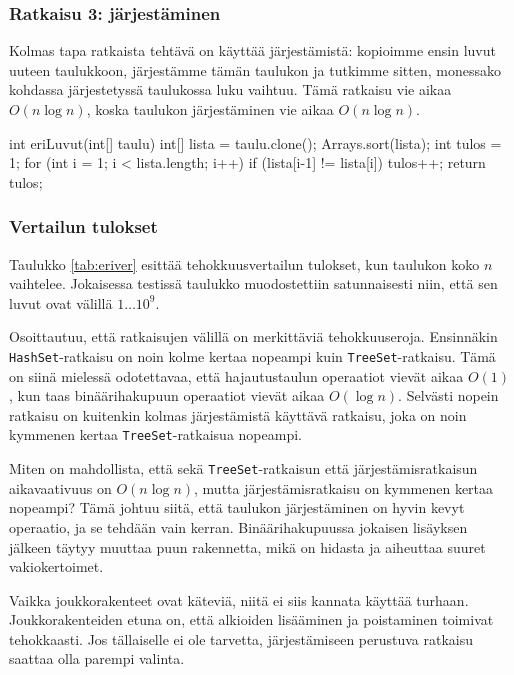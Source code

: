 \subsubsection{Ratkaisu 3: järjestäminen}

Kolmas tapa ratkaista tehtävä on käyttää järjestämistä:
kopioimme ensin luvut uuteen taulukkoon, järjestämme tämän taulukon ja
tutkimme sitten, monessako kohdassa järjestetyssä taulukossa luku vaihtuu.
Tämä ratkaisu vie aikaa $O(n \log n)$, koska taulukon järjestäminen
vie aikaa $O(n \log n)$.

\begin{code}
int eriLuvut(int[] taulu) {
    int[] lista = taulu.clone();
    Arrays.sort(lista);
    int tulos = 1;
    for (int i = 1; i < lista.length; i++) {
        if (lista[i-1] != lista[i]) tulos++;
    }
    return tulos;
}
\end{code}

\subsubsection{Vertailun tulokset}

Taulukko \ref{tab:eriver} esittää tehokkuusvertailun tulokset,
kun taulukon koko $n$ vaihtelee.
Jokaisessa testissä taulukko muodostettiin satunnaisesti niin,
että sen luvut ovat välillä $1 \dots 10^9$.

Osoittautuu, että ratkaisujen välillä on merkittäviä tehokkuuseroja.
Ensinnäkin \texttt{HashSet}-ratkaisu on noin kolme kertaa
nopeampi kuin \texttt{TreeSet}-ratkaisu.
Tämä on siinä mielessä odotettavaa, että hajautustaulun
operaatiot vievät aikaa $O(1)$, kun taas binäärihakupuun
operaatiot vievät aikaa $O(\log n)$.
Selvästi nopein ratkaisu on kuitenkin kolmas järjestämistä
käyttävä ratkaisu, joka on noin kymmenen kertaa
\texttt{TreeSet}-ratkaisua nopeampi.

Miten on mahdollista, että sekä \texttt{TreeSet}-ratkaisun että
järjestämisrat\-kaisun aikavaativuus on $O(n \log n)$, mutta
järjestämisratkaisu on kymmenen kertaa nopeampi?
Tämä johtuu siitä, että taulukon järjestäminen on hyvin kevyt
operaatio, ja se tehdään vain kerran.
Binäärihakupuussa jokaisen lisäyksen jälkeen täytyy muuttaa
puun rakennetta, mikä on hidasta ja aiheuttaa suuret vakiokertoimet.

Vaikka joukkorakenteet ovat käteviä, niitä ei siis kannata
käyttää turhaan.
Joukkorakenteiden etuna on, että alkioiden lisääminen ja poistaminen
toimivat tehokkaasti.
Jos tällaiselle ei ole tarvetta, järjestämiseen perustuva ratkaisu
saattaa olla parempi valinta.

